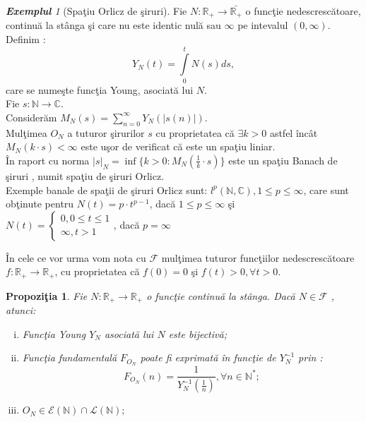 \documentclass[ a4paper, 12pt]{report}
\newtheorem{prop}[theorem]{\bf Propozi\c tia }
\theoremstyle{remark}
\newtheorem{exemple}{\bf Exemplul}[section]
\numberwithin{equation}{section}
\begin{document}
\begin{exemple}[Spa\c tiu Orlicz de \c siruri]
Fie $N : \mathbb{R}_{+} \rightarrow \bar{\mathbb{R}_{+}}$ o func\c tie nedescresc\u atoare, continu\u a la st\^anga \c si care nu este identic nul\u a sau $\infty$ pe intevalul $(0,\infty)$. Definim :
\[ Y_N (t) = \int\limits_{0}^{t} N(s) ds,\] care se nume\c ste func\c tia Young, asociat\u a lui $N$.\\
Fie $s : \mathbb{N} \rightarrow \mathbb{C}.$ \\
Consider\u am $M_N (s)= \sum\limits_{n=0}^{\infty} Y_N(\lvert s(n) \rvert).$\\
Mul\c timea $O_N$ a tuturor \c sirurilor $s$ cu proprietatea c\u a $\exists k > 0$ astfel \^inc\^at $M_N(k \cdot s)< \infty$ este u\c sor de verificat c\u a este un spa\c tiu liniar.\\ \^In raport cu norma $\lvert s \rvert_N = \inf\{ k>0: M_N(\frac{1}{k} \cdot s) \}$ este un spa\c tiu Banach de \c siruri , numit spa\c tiu de \c siruri Orlicz.\\
Exemple banale de spa\c tii de \c siruri Orlicz sunt: $l^{p}(\mathbb{N},\mathbb{C}), 1 \leq p \leq \infty$, care sunt ob\c tinute pentru $N(t) = p \cdot t^{p-1}$, dac\u a $1 \leq p \leq \infty$ \c si\\ $N(t) = \begin{cases}
0, 0 \leq t \leq 1\\
\infty, t > 1
\end{cases}$, dac\u a $p =\infty$
\end{exemple}
\^In cele ce vor urma vom nota cu $\mathcal{F}$ mul\c timea tuturor func\c tiilor nedescresc\u atoare $f : \mathbb{R}_{+} \rightarrow \mathbb{R}_{+}$, cu proprietatea c\u a $f(0) = 0$ \c si  $f(t) > 0, \forall t > 0.$
\begin{prop}
Fie $N : \mathbb{R}_{+} \rightarrow \mathbb{R}_{+}$ o func\c tie continu\u a la st\^anga. Dac\u a $N \in \mathcal{F}$ , atunci:
\begin{enumerate}[(i)]
\item Func\c tia Young $Y_N$ asociat\u a lui $N$ este bijectiv\u a;
\item Func\c tia fundamental\u a $F_{O_{N}}$ poate fi exprimat\u a \^in func\c tie de $Y_N^{-1}$ prin :
\[ F_{O_{N}} (n) = \frac{1}{Y_{N}^{-1}(\frac{1}{n})}, \forall n \in \mathbb{N}^{\ast};\]
\item $O_N \in \mathcal{E}(\mathbb{N}) \cap \mathcal{L}(\mathbb{N});$
\end{enumerate}
\end{prop}
\end{document}
